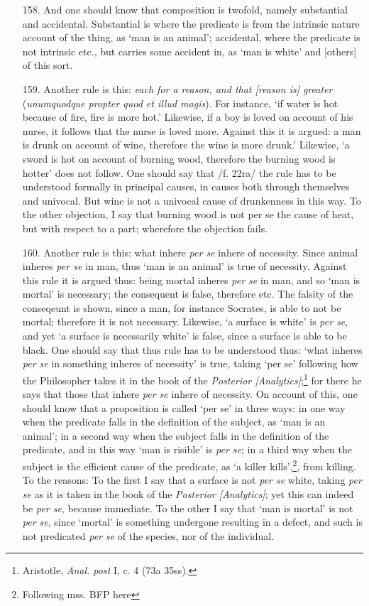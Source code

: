 \documentclass[]{article}
\begin{document}
\begin{itemize}
\item[158.] And one should know that composition is twofold, namely substantial and accidental. Substantial is where the predicate is from the intrinsic nature account of the thing, as `man is an animal'; accidental, where the predicate is not intrinsic etc., but carries some accident in, as `man is white' and [others] of this sort.
\item[159.] Another rule is this: \textit{each for a reason, and that [reason is] greater} (\textit{unumquodque propter quod et illud magis}). For instance, `if water is hot because of fire, fire is more hot.' Likewise, if a boy is loved on account of his nurse, it follows that the nurse is loved more. Against this it is argued: a man is drunk on account of wine, therefore the wine is more drunk.' Likewise, `a sword is hot on account of burning wood, therefore the burning wood is hotter' does not follow. One should say that /f. 22ra/ the rule has to be understood formally in principal causes, in causes both through themselves and univocal. But wine is not a univocal cause of drunkenness in this way. To the other objection, I say that burning wood is not per se the cause of heat, but with respect to a part; wherefore the objection fails. 
\item[160.] Another rule is this: what inhere \textit{per se} inhere of necessity. Since animal inheres \textit{per se} in man, thus `man is an animal' is true of necessity. Against this rule it is argued thus: being mortal inheres \textit{per se} in man, and so `man is mortal' is necessary; the consequent is false, therefore etc. The falsity of the conseqeunt is shown, since a man, for instance Socrates, is able to not be mortal; therefore it is not necessary. Likewise, `a surface is white' is \textit{per se}, and yet `a surface is necessarily white' is false, since a surface is able to be black. One should say that thus rule has to be understood thus: `what inheres \textit{per se} in something inheres of necessity' is true, taking `per se' following how the Philosopher takes it in the book of the \textit{Posterior [Analytics]};\footnote{Aristotle, \textit{Anal. post} I, c. 4 (73a 35ss).} for there he says that those that inhere \textit{per se} inhere of necessity. On account of this, one should know that a proposition is called `per se' in three ways: in one way when the predicate falls in the definition of the subject, as `man is an animal'; in a second way when the subject falls in the definition of the predicate, and in this way `man is risible' is \textit{per se}; in a third way when the subject is the efficient cause of the predicate, as `a killer kills',\footnote{Following mss. BFP here}, from killing. To the reasons: To the first I say that a surface is not \textit{per se} white, taking \textit{per se} as it is taken in the book of the \textit{Posterior [Analytics]}; yet this can indeed be \textit{per se}, because immediate. To the other I say that `man is mortal' is not \textit{per se}, since `mortal' is something undergone resulting in a defect, and such is not predicated \textit{per se} of the species, nor of the individual.

\end{itemize}
\end{document}
